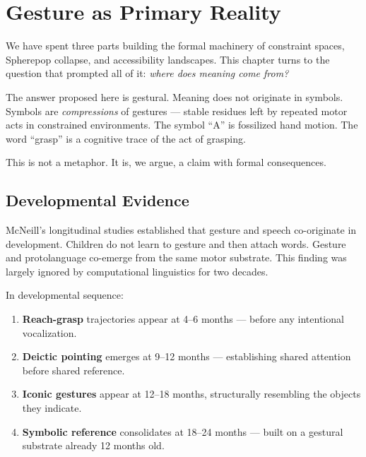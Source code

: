 
\chapter{Gesture as Primary Reality}



We have spent three parts building the formal machinery of constraint spaces,
Spherepop collapse, and accessibility landscapes. This chapter turns to the
question that prompted all of it: \emph{where does meaning come from?}

The answer proposed here is gestural. Meaning does not originate in symbols.
Symbols are \emph{compressions} of gestures — stable residues left by repeated
motor acts in constrained environments. The symbol ``A'' is fossilized hand
motion. The word ``grasp'' is a cognitive trace of the act of grasping.

This is not a metaphor. It is, we argue, a claim with formal consequences.

\section{Developmental Evidence}

\begin{historynote}
  McNeill's longitudinal studies \autocite{mcneill1992} established that
  gesture and speech co-originate in development. Children do not learn to
  gesture and then attach words. Gesture and protolanguage co-emerge from the
  same motor substrate. This finding was largely ignored by computational
  linguistics for two decades.
\end{historynote}

In developmental sequence:
\begin{enumerate}
  \item \textbf{Reach-grasp} trajectories appear at 4–6 months — before any
        intentional vocalization.
  \item \textbf{Deictic pointing} emerges at 9–12 months — establishing shared
        attention before shared reference.
  \item \textbf{Iconic gestures} appear at 12–18 months, structurally
        resembling the objects they indicate.
  \item \textbf{Symbolic reference} consolidates at 18–24 months — built
        on a gestural substrate already 12 months old.
\end{enumerate}

